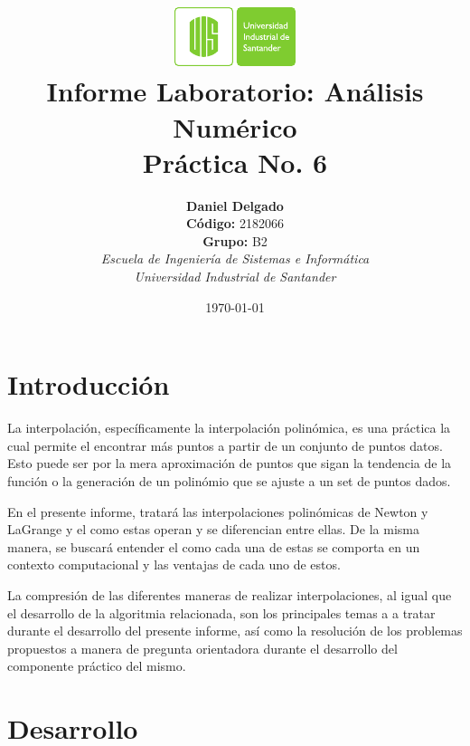 \documentclass[english,notitlepage,letterpaper, 10pt]{article} %
\newcommand{\university}{\normalsize Universidad Industrial de Santander}
\newcommand{\faculty}{\normalsize  Escuela de Ingenier\'ia de Sistemas e Inform\'atica}
\newcommand{\codigo}{\normalsize  2182066}
\newcommand{\grupo}{\normalsize  B2}
\begin{document}
\title{	\vspace{-12mm}\includegraphics[width=0.2\linewidth]{Logos/UIS.pdf}\\Informe Laboratorio: An\'alisis Num\'erico\\  \centering Pr\'actica No. 6}
\author{
  \textbf{Daniel Delgado} \\ \textbf{C\'odigo:} \codigo\\
  \textbf{Grupo:} \grupo\\
  \textit{\faculty}\\
  \textit{\university}}
\date{\today}
\maketitle

\section{Introducci\'on}

La interpolación, específicamente la interpolación polinómica, es una práctica la cual permite el encontrar más puntos a partir de un conjunto de puntos datos. Esto puede ser por la mera aproximación de puntos que sigan la tendencia de la función o la generación de un polinómio que se ajuste a un set de puntos dados.

En el presente informe, tratará las interpolaciones polinómicas de Newton y LaGrange y el como estas operan y se diferencian entre ellas. De la misma manera, se buscará entender el como cada una de estas se comporta en un contexto computacional y las ventajas de cada uno de estos.

La compresión de las diferentes maneras de realizar interpolaciones, al igual que el desarrollo de la algoritmia relacionada, son los principales temas a a tratar durante el desarrollo del presente informe, así como la resolución de los problemas propuestos a manera de pregunta orientadora durante el desarrollo del componente práctico del mismo.

\section{Desarrollo}
\end{document}

